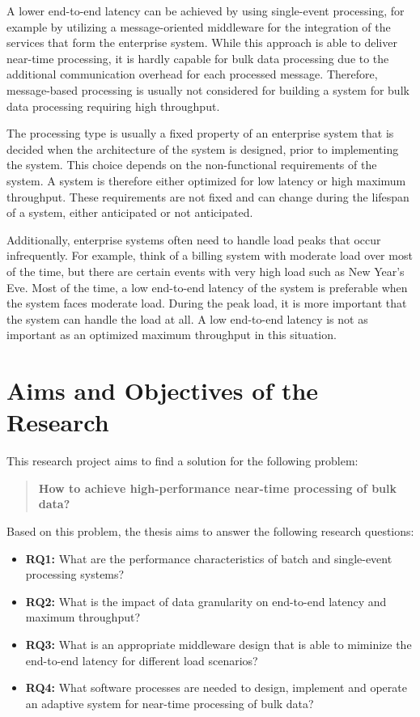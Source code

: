 A lower end-to-end latency can be achieved by using single-event processing, for example by utilizing a message-oriented middleware for the integration of the services that form the enterprise system. While this approach is able to deliver near-time processing, it is hardly capable for bulk data processing due to the additional communication overhead for each processed message. Therefore, message-based processing is usually not considered for building a system for bulk data processing requiring high throughput.

The processing type is usually a fixed property of an enterprise system that is decided when the architecture of the system is designed, prior to implementing the system. This choice depends on the non-functional requirements of the system. A system is therefore either optimized for low latency or high maximum throughput. 
These requirements are not fixed and can change during the lifespan of a system, either anticipated or not anticipated.

Additionally, enterprise systems often need to handle load peaks that occur infrequently. For example, think of a billing system with moderate load over most of the time, but there are certain events with very high load such as New Year's Eve. Most of the time, a low end-to-end latency of the system is preferable when the system faces moderate load. During the peak load, it is more important that the system can handle the load at all. A low end-to-end latency is not as important as an optimized maximum throughput in this situation.

\section{Aims and Objectives of the Research}\label{sec:research_objectives}
This research project aims to find a solution for the following problem:
\begin{quote}
\textbf{How to achieve high-performance near-time processing of bulk data?}
\end{quote}

Based on this problem, the thesis aims to answer the following research questions:
\begin{itemize}
	\item \textbf{RQ1:} What are the performance characteristics of batch and single-event processing systems?
	\item \textbf{RQ2:} What is the impact of data granularity on end-to-end latency and maximum throughput?
	\item \textbf{RQ3:} What is an appropriate middleware design that is able to miminize the end-to-end latency for different load scenarios?
	\item \textbf{RQ4:} What software processes are needed to design, implement and operate an adaptive system for near-time processing of bulk data?
\end{itemize}

